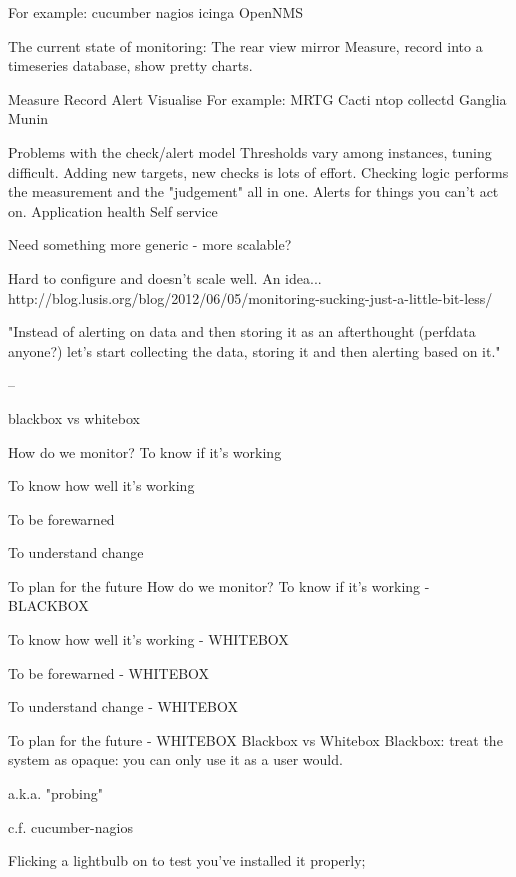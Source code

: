 \documentclass[online,12pt,helvetica]{chaksem}
\begin{document}
For example:
cucumber
nagios
icinga
OpenNMS

The current state of monitoring:
The rear view mirror
Measure, record into a timeseries database, show pretty charts.

Measure
Record
Alert
Visualise
For example:
MRTG
Cacti
ntop 
collectd
Ganglia
Munin

Problems with the check/alert model
Thresholds vary among instances, tuning difficult.
Adding new targets, new checks is lots of effort.
Checking logic performs the measurement and the "judgement" all in one.
Alerts for things you can't act on.
Application health
Self service

Need something more generic - more scalable?



Hard to configure and doesn't scale well.
An idea...
http://blog.lusis.org/blog/2012/06/05/monitoring-sucking-just-a-little-bit-less/

"Instead of alerting on data and then storing it as an afterthought (perfdata anyone?) let’s start collecting the
data, storing it and then alerting based on it."

--

blackbox vs whitebox



How do we monitor?
To know if it's working

To know how well it's working

To be forewarned

To understand change

To plan for the future
How do we monitor?
To know if it's working - BLACKBOX

To know how well it's working - WHITEBOX

To be forewarned - WHITEBOX

To understand change - WHITEBOX

To plan for the future - WHITEBOX
Blackbox vs Whitebox
Blackbox: treat the system as opaque: you can only use it as a user would.

a.k.a. "probing"

c.f. cucumber-nagios

Flicking a lightbulb on to test you've installed it properly;                                                                                                  
                                                                                                                                                               
\end{document}
